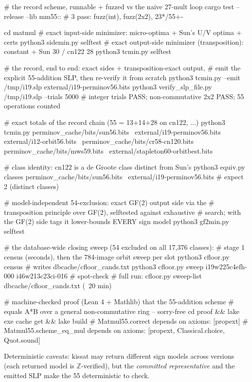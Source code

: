 \documentclass[10pt]{article}
\begin{document}
\begin{Code}
# the record scheme, runnable + fuzzed vs the naive 27-mult loop
cargo test --release --lib mm55::   # 3 pass: fuzz(int), fuzz(2x2), 23*/55+-

cd matmul
# exact input-side minimizer: micro-optima + Sun's U/V optima + certs
python3 sidemin.py selftest
# exact output-side minimizer (transposition): constant + Sun 30 / cn122 28
python3 tcmin.py selftest

# the record, end to end: exact sides + transposition-exact output,
# emit the explicit 55-addition SLP, then re-verify it from scratch
python3 tcmin.py --emit /tmp/i19.slp external/i19-perminov56.bits
python3 verify_slp_file.py /tmp/i19.slp --trials 5000
#   integer trials PASS; non-commutative 2x2 PASS; 55 operations counted

# exact totals of the record chain (55 = 13+14+28 on cn122, ...)
python3 tcmin.py perminov_cache/bits/sun56.bits \
    external/i19-perminov56.bits external/i12-orbit56.bits \
    perminov_cache/bits/cr58-cn120.bits perminov_cache/bits/mws59.bits \
    external/stapleton60-orbitbest.bits

# class identity: cn122 is a de Groote class distinct from Sun's
python3 equiv.py classes perminov_cache/bits/sun56.bits \
    external/i19-perminov56.bits          # expect 2 (distinct classes)

# model-independent 54-exclusion: exact GF(2) output side via the
# transposition principle over GF(2), selftested against exhaustive
# search; with the GF(2) side tags it lower-bounds EVERY sign model
python3 gf2min.py selftest

# the database-wide closing sweep (54 excluded on all 17,376 classes):
# stage 1 census (seconds), then the 784-image orbit sweep per slot
python3 cfloor.py census          # writes dbcache/cfloor_cands.txt
python3 cfloor.py sweep i19w225c4efh-000 i46w213c23ci-016   # spot-check
#   full run: cfloor.py sweep-list dbcache/cfloor_cands.txt (~20 min)

# machine-checked proof (Lean 4 + Mathlib) that the 55-addition scheme
# equals A*B over a general non-commutative ring -- sorry-free
cd proof && lake exe cache get && lake build
#   Matmul55.correct       depends on axioms: [propext]
#   Matmul55.scheme_eq_mul depends on axioms: [propext, Classical.choice, Quot.sound]
\end{Code}

Deterministic caveats: kissat may return different sign models across
versions (each returned model is $\mathbb{Z}$-verified), but the
\emph{committed representative}
 and the emitted SLP make the 55
deterministic to check.
\end{document}
